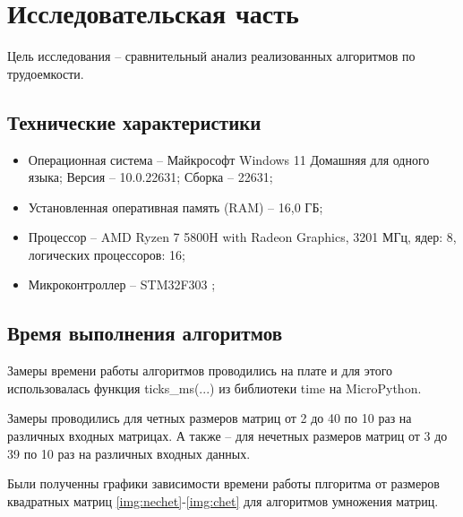 \chapter{Исследовательская часть}

Цель исследования -- сравнительный анализ реализованных алгоритмов по трудоемкости.


\section{Технические характеристики}
\begin{itemize}
	\item {Операционная система – Майкрософт Windows 11 Домашняя для одного языка; Версия -- 10.0.22631; Сборка -- 22631;}
	\item {Установленная оперативная память (RAM) -- 16,0 ГБ;}
	\item {Процессор -- AMD Ryzen 7 5800H with Radeon Graphics, 3201 МГц, ядер: 8, логических процессоров: 16;}
	\item {Микроконтроллер -- STM32F303 \cite{plata};}
	
\end{itemize}

\section{Время выполнения алгоритмов}
Замеры времени работы алгоритмов проводились на плате и для этого использовалась функция ticks\_ms(...) из библиотеки time на MicroPython\cite{python-time}.

Замеры проводились для четных размеров матриц от 2 до 40 по 10 раз на различных входных матрицах. А также -- для нечетных размеров матриц от 3 до 39 по 10 раз на различных входных данных.

Были полученны графики зависимости времени работы плгоритма от размеров квадратных матриц \ref{img:nechet}-\ref{img:chet} для алгоритмов умножения матриц.


\clearpage



